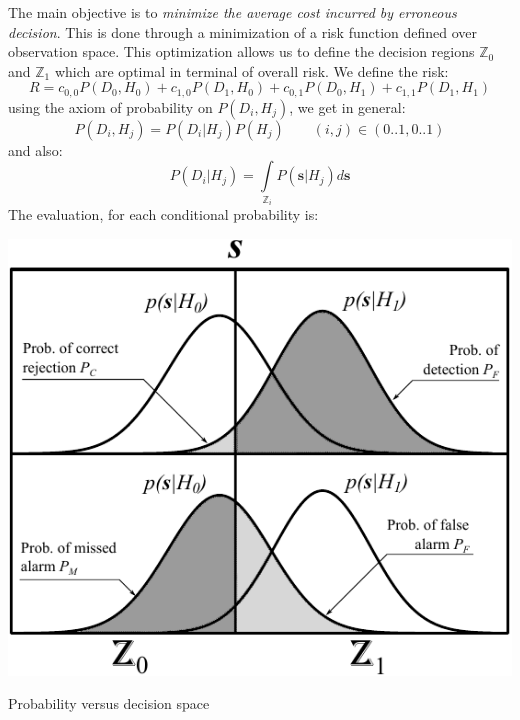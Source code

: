 The main objective is to \emph{minimize the average cost incurred by erroneous decision}. This is done through a minimization of a risk function defined over observation space. This optimization allows us to define the decision regions $\mathbb{Z}_0$ and $\mathbb{Z}_1$ which are optimal in terminal of overall risk. We define the risk:
\begin{equation}
R = c_{0,0} P(D_0, H_0) + c_{1,0} P(D_1, H_0) + c_{0,1} P(D_0, H_1) + c_{1,1} P(D_1, H_1)
\end{equation}
using the axiom of probability on $P(D_i,H_j)$, we get in general:
\begin{equation}
P(D_i,H_j) = P(D_i|H_j) P(H_j) \qquad (i,j) \in (0..1,0..1)
\end{equation}
and also:
\begin{equation}
P(D_i|H_j) = \int\limits_{\mathbb{Z}_i}P(\mathbf{s}|H_j)d\mathbf{s}
\end{equation}
The evaluation, for each conditional probability is:
\begin{marginfigure}
	\centering
	\includegraphics[scale=0.55]{ch3/img/probcurves.pdf}
	\caption{Probability versus decision space}
\end{marginfigure}
